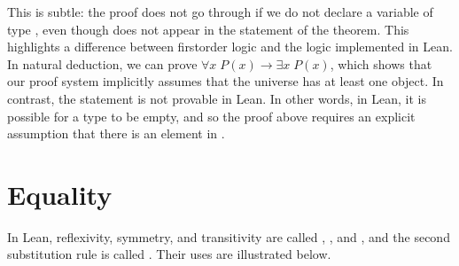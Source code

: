 \documentclass[letterpaper,10pt,english]{sphinxmanual}
\begin{document}
\sphinxAtStartPar
This is subtle: the proof does not go through if we do not declare a variable  of type , even though  does not appear in the statement of the theorem. This highlights a difference between first\sphinxhyphen{}order logic and the logic implemented in Lean. In natural deduction, we can prove \(\forall x \; P(x) \to \exists x \; P(x)\), which shows that our proof system implicitly assumes that the universe has at least one object. In contrast, the statement  is not provable in Lean. In other words, in Lean, it is possible for a type to be empty, and so the proof above requires an explicit assumption that there is an element  in .


\section{Equality}
\label{\detokenize{first_order_logic_in_lean:equality}}
\sphinxAtStartPar
In Lean, reflexivity, symmetry, and transitivity are called , , and , and the second substitution rule is called . Their uses are illustrated below.
\end{document}
